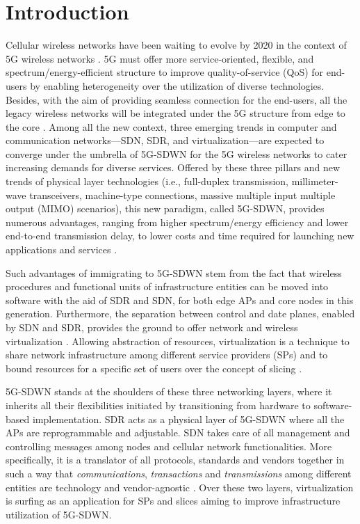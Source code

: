 \documentclass[conference]{IEEEtran}
\begin{document}
\section{Introduction}
Cellular wireless networks have been waiting to evolve by 2020 in the context of 5G wireless networks \cite{7113228,7108393}. 5G must offer more service-oriented, flexible, and spectrum/energy-efficient structure to improve quality-of-service (QoS) for end-users by enabling heterogeneity over the utilization of diverse technologies. Besides, with the aim of providing seamless connection for the end-users, all the legacy wireless networks will be integrated under the 5G structure from edge to the core \cite{7113226,7120046,peng2015system}. Among all the new context, three emerging trends in computer and communication networks---SDN, SDR, and virtualization---are expected to converge under the umbrella of 5G-SDWN for the 5G wireless networks to cater increasing demands for diverse services. Offered by these three pillars and new trends of physical layer technologies (i.e., full-duplex transmission, millimeter-wave transceivers, machine-type connections, massive multiple input multiple output (MIMO) scenarios), this new paradigm, called 5G-SDWN, provides numerous advantages, ranging from higher spectrum/energy efficiency and lower end-to-end transmission delay, to lower costs and time required for launching new applications and services \cite{7039225,7108393,7084578}.
	
Such advantages of immigrating to 5G-SDWN stem from the fact that wireless procedures and functional units of infrastructure entities can be moved into software with the aid of SDR and SDN, for both edge APs and core nodes in this generation. Furthermore, the separation between control and date planes, enabled by SDN and SDR, provides the ground to offer network and wireless virtualization \cite{7045398,7039225,6845049,7116189,costa2015software}. Allowing abstraction of resources, virtualization is a technique to share network infrastructure among different service providers (SPs) and to bound resources for a specific set of users over the concept of slicing \cite{wen2013wireless,wen2014multi,6887287,6117098}.

5G-SDWN stands at the shoulders of these three networking layers, where it inherits all their flexibilities initiated by transitioning from hardware to software-based implementation. SDR acts as a physical layer of 5G-SDWN where all the APs are reprogrammable and adjustable. SDN takes care of all management and controlling messages among nodes and cellular network functionalities. More specifically, it is a translator of all protocols, standards and vendors together in such a way that \textit{communications}, \textit{transactions} and \textit{transmissions} among different entities are technology and vendor-agnostic \cite{6461195,6819788}. Over these two layers, virtualization is surfing as an application for SPs and slices aiming to improve infrastructure utilization of 5G-SDWN. 
\end{document}
